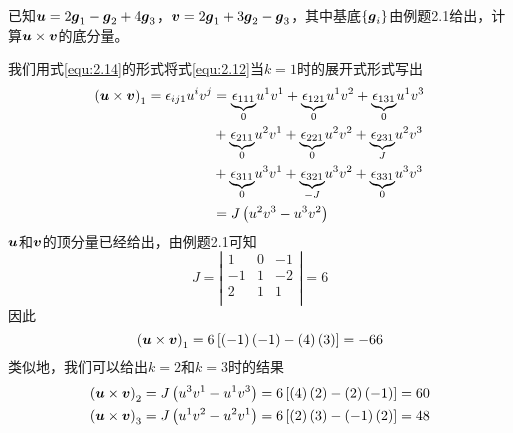 \begin{example}
    已知$\boldsymbol{u}=2\boldsymbol{g}_1-\boldsymbol{g}_2+4\boldsymbol{g}_3$，$\boldsymbol{v}=2\boldsymbol{g}_1+3\boldsymbol{g}_2-\boldsymbol{g}_3$，其中基底$\{\boldsymbol{g}_{i}\}$由例题2.1给出，计算$\boldsymbol{u}\times \boldsymbol{v}$的底分量。
\end{example}
\begin{solution}
    我们用式\eqref{equ:2.14}的形式将式\eqref{equ:2.12}当$k=1$时的展开式形式写出
    \begin{align*}
        \left( \boldsymbol{u}\times \boldsymbol{v} \right) _1=\epsilon _{ij1}u^iv^j&=\underset{0}{\underbrace{\epsilon _{111}}}u^1v^1+\underset{0}{\underbrace{\epsilon _{121}}}u^1v^2+\underset{0}{\underbrace{\epsilon _{131}}}u^1v^3\\
        &+\underset{0}{\underbrace{\epsilon _{211}}}u^2v^1+\underset{0}{\underbrace{\epsilon _{221}}}u^2v^2+\underset{J}{\underbrace{\epsilon _{231}}}u^2v^3\\
        &+\underset{0}{\underbrace{\epsilon _{311}}}u^3v^1+\underset{-J}{\underbrace{\epsilon _{321}}}u^3v^2+\underset{0}{\underbrace{\epsilon _{331}}}u^3v^3\\
        &=J\left( u^2v^3-u^3v^2 \right)
    \end{align*}
    $\boldsymbol{u}$和$\boldsymbol{v}$的顶分量已经给出，由例题2.1可知
    \begin{equation*}
        J=\left| \begin{matrix}
            1&		0&		-1\\
            -1&		1&		-2\\
            2&		1&		1\\
        \end{matrix} \right|=6
    \end{equation*}
    因此
    \begin{equation*}
        \left( \boldsymbol{u}\times \boldsymbol{v} \right) _1=6\left[ \left( -1 \right) \left( -1 \right) -\left( 4 \right) \left( 3 \right) \right] =-66
    \end{equation*}
    类似地，我们可以给出$k=2$和$k=3$时的结果
    \begin{align*}
        \left( \boldsymbol{u}\times \boldsymbol{v} \right) _2&=J\left( u^3v^1-u^1v^3 \right) =6\left[ \left( 4 \right) \left( 2 \right) -\left( 2 \right) \left( -1 \right) \right] =60\\
        \left( \boldsymbol{u}\times \boldsymbol{v} \right) _3&=J\left( u^1v^2-u^2v^1 \right) =6\left[ \left( 2 \right) \left( 3 \right) -\left( -1 \right) \left( 2 \right) \right] =48
    \end{align*}
\end{solution}

